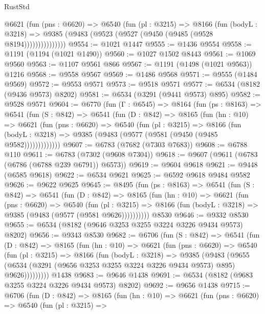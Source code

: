 \begin{lexlean}{RustStd}
\begin{coremodule}
              @6621
                (fun (pns : @6620) =>
                @6540
                  (fun (pl : @3215) =>
                  @8166
                    (fun (bodyL : @3218) =>
                    @9385 (@9483 (@9523 (@9527 (@9450 (@9485 (@9528 @8194)))))))))))))))
@9554 := @1021 @1447
@9555 := @1436 @9554
@9558 := @1191 (@1194 (@1021 @1490))
@9560 := @1027 @1502 @8443
@9561 := @1069 @9560
@9563 := @1107 @9561 @866
@9567 := @1191 (@1498 (@1021 @9563)) @1216
@9568 := @9558 @9567
@9569 := @1486 @9568
@9571 := @9555 (@1484 @9569)
@9572 := @9553 @9571
@9573 := @9518 @9571
@9577 := @6534 (@8182 (@9436 @9573) @8202)
@9581 := @6534 (@3291 (@9441 @9573) @895)
@9582 := @9528 @9571
@9604 := @6770
    (fun (Γ : @6545) =>
    @8164
      (fun (ps : @8163) =>
      @6541
        (fun (S : @842) =>
        @6541
          (fun (D : @842) =>
          @8165
            (fun (hn : @10) =>
            @6621
              (fun (pns : @6620) =>
              @6540
                (fun (pl : @3215) =>
                @8166
                  (fun (bodyL : @3218) =>
                  @9385 (@9483 (@9577 (@9581 (@9450 (@9485 @9582)))))))))))))
@9607 := @6783 (@7682 (@7303 @7683))
@9608 := @6788 @110
@9611 := @6783 (@7302 (@9608 @7304))
@9618 := @9607 (@9611 (@6783 (@6786 (@6788 @239 @6791)) @6573))
@9619 := @9604 @9618
@9621 := @9448 (@6585 @9618)
@9622 := @6534 @9621
@9625 := @6592 @9618 @9484 @9582
@9626 := @9622 @9625
@9645 := @8495
    (fun (ps : @8163) =>
    @6541
      (fun (S : @842) =>
      @6541
        (fun (D : @842) =>
        @8165
          (fun (hn : @10) =>
          @6621
            (fun (pns : @6620) =>
            @6540
              (fun (pl : @3215) =>
              @8166 (fun (bodyL : @3218) => @9385 (@9483 (@9577 (@9581 @9626))))))))))
    @8530
@9646 := @9332 @8530
@9655 := @6534 (@8182 (@9646 @3253 @3255 @3224 @3226 @9434 @9573) @8202)
@9656 := @9343 @8530
@9682 := @6706
    (fun (S : @842) =>
    @6541
      (fun (D : @842) =>
      @8165
        (fun (hn : @10) =>
        @6621
          (fun (pns : @6620) =>
          @6540
            (fun (pl : @3215) =>
            @8166
              (fun (bodyL : @3218) =>
              @9385
                (@9483
                  (@9655
                    (@6534 (@3291 (@9656 @3253 @3255 @3224 @3226 @9434 @9573) @895) @9626)))))))))
    @1438
@9683 := @9646 @1438
@9691 := @6534 (@8182 (@9683 @3255 @3224 @3226 @9434 @9573) @8202)
@9692 := @9656 @1438
@9715 := @6706
    (fun (D : @842) =>
    @8165
      (fun (hn : @10) =>
      @6621
        (fun (pns : @6620) =>
        @6540
          (fun (pl : @3215) =>

\end{coremodule}
\end{lexlean}
